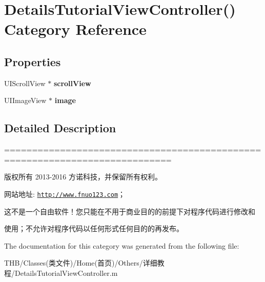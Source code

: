 \hypertarget{category_details_tutorial_view_controller_07_08}{}\section{Details\+Tutorial\+View\+Controller() Category Reference}
\label{category_details_tutorial_view_controller_07_08}
\subsection*{Properties}
\begin{DoxyCompactItemize}
\item 
\mbox{\label{category_details_tutorial_view_controller_07_08_a1d24e633400a8ee409ae2056e3ca54a2}} 
U\+I\+Scroll\+View $\ast$ {\bfseries scroll\+View}
\item 
\mbox{\label{category_details_tutorial_view_controller_07_08_ae63fdb8ad5d4bd13cbda3f3b1aa52bc2}} 
U\+I\+Image\+View $\ast$ {\bfseries image}
\end{DoxyCompactItemize}


\subsection{Detailed Description}
============================================================================

版权所有 2013-\/2016 方诺科技，并保留所有权利。

网站地址\+: \href{http://www.fnuo123.com}{\tt http\+://www.\+fnuo123.\+com}； 



这不是一个自由软件！您只能在不用于商业目的的前提下对程序代码进行修改和

使用；不允许对程序代码以任何形式任何目的的再发布。 

 

The documentation for this category was generated from the following file\+:\begin{DoxyCompactItemize}
\item 
T\+H\+B/\+Classes(类文件)/\+Home(首页)/\+Others/详细教程/Details\+Tutorial\+View\+Controller.\+m\end{DoxyCompactItemize}
